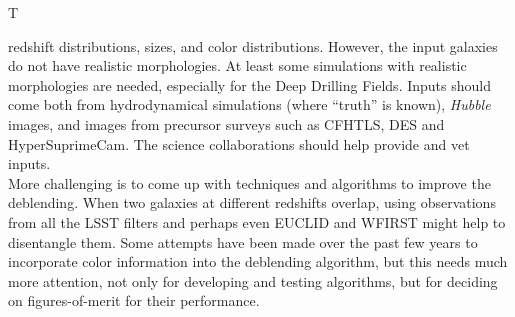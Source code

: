 \begin{tasklist}{T}
\begin{task}
{redshift distributions, sizes, and color distributions. However, the
input galaxies do not have realistic morphologies. At least some simulations
with realistic morphologies are needed, especially for the Deep Drilling Fields. 
Inputs should come both from hydrodynamical simulations (where ``truth'' is known),
{\it Hubble} images, and images from precursor surveys such as CFHTLS, DES and HyperSuprimeCam.
The science collaborations should help provide and vet inputs. \\
More challenging is to come up with techniques and algorithms to improve the
deblending. When two galaxies at different redshifts overlap, using observations
from all the LSST filters and perhaps even EUCLID and WFIRST might 
help to disentangle them. Some attempts have been made over the past few years
to incorporate color information into the deblending algorithm, but this needs
much more attention, not only for developing and testing algorithms, but for
deciding on figures-of-merit for their performance.
}
\end{task}

\begin{task}
\label{task:gal:XXX}
\motivation{}
\activities{}
\deliverables{}
\end{task}

\begin{task}
\label{task:gal:XXX}
\motivation{}
\activities{}
\deliverables{}
\end{task}



\end{tasklist}
